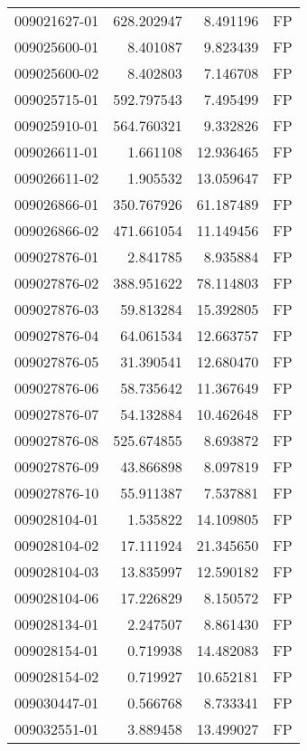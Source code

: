 \begin{tabular}{lrrl}
009021627-01 &  628.202947 &       8.491196 &   FP \\
009025600-01 &    8.401087 &       9.823439 &   FP \\
009025600-02 &    8.402803 &       7.146708 &   FP \\
009025715-01 &  592.797543 &       7.495499 &   FP \\
009025910-01 &  564.760321 &       9.332826 &   FP \\
009026611-01 &    1.661108 &      12.936465 &   FP \\
009026611-02 &    1.905532 &      13.059647 &   FP \\
009026866-01 &  350.767926 &      61.187489 &   FP \\
009026866-02 &  471.661054 &      11.149456 &   FP \\
009027876-01 &    2.841785 &       8.935884 &   FP \\
009027876-02 &  388.951622 &      78.114803 &   FP \\
009027876-03 &   59.813284 &      15.392805 &   FP \\
009027876-04 &   64.061534 &      12.663757 &   FP \\
009027876-05 &   31.390541 &      12.680470 &   FP \\
009027876-06 &   58.735642 &      11.367649 &   FP \\
009027876-07 &   54.132884 &      10.462648 &   FP \\
009027876-08 &  525.674855 &       8.693872 &   FP \\
009027876-09 &   43.866898 &       8.097819 &   FP \\
009027876-10 &   55.911387 &       7.537881 &   FP \\
009028104-01 &    1.535822 &      14.109805 &   FP \\
009028104-02 &   17.111924 &      21.345650 &   FP \\
009028104-03 &   13.835997 &      12.590182 &   FP \\
009028104-06 &   17.226829 &       8.150572 &   FP \\
009028134-01 &    2.247507 &       8.861430 &   FP \\
009028154-01 &    0.719938 &      14.482083 &   FP \\
009028154-02 &    0.719927 &      10.652181 &   FP \\
009030447-01 &    0.566768 &       8.733341 &   FP \\
009032551-01 &    3.889458 &      13.499027 &   FP \\

\end{tabular}
